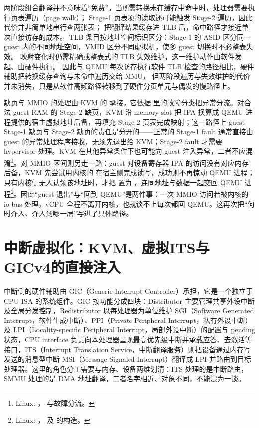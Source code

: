 两阶段组合翻译并不意味着“免费”。当所需转换未在缓存中命中时，处理器需要执行页表遍历（page walk）；
Stage-1 页表项的读取还可能触发 Stage-2 遍历，因此代价并非简单地串行查两张表；
把翻译结果缓存进 TLB 后，命中路径才接近单次直接访存的成本。
TLB 条目按地址空间标识区分：Stage-1 的 ASID 区分同一 guest 内的不同地址空间，VMID 区分不同虚拟机，使多 guest 切换时不必整表失效。
映射变化时仍需精确或整表式的 TLB 失效维护，这一维护动作由软件发起、由硬件执行。
因此与 QEMU 每次访存执行软件 TLB 检查的路径相比，硬件辅助把转换缓存查询与未命中遍历交给 MMU，
但两阶段遍历与失效维护的代价并未消失，只是从软件高频路径转移到了硬件分页单元与偶发的慢路径上\cite{source4,source5}。

缺页与 MMIO 的处理由 KVM 的  承接，它依据  里的故障分类把异常分流。对合法 guest RAM 的 Stage-2 缺页，KVM 沿 memory slot 把 IPA 换算成 QEMU 进程提供的宿主虚拟地址后备，再填充 Stage-2 页表完成映射；这一路径上 guest Stage-1 缺页与 Stage-2 缺页的责任是分开的——正常的 Stage-1 fault 通常直接由 guest 的异常处理程序接收，无须先退出给 KVM；Stage-2 fault 才需要 hypervisor 处理。KVM 在其他异常条件下也可能向 guest 注入异常，二者不应混淆\footnote{Linux: ， 与故障分流。}。对 MMIO 区间则另走一路：guest 对设备寄存器 IPA 的访问没有对应内存后备，KVM 先尝试用内核的  在宿主侧完成读写，成功则不再惊动 QEMU 进程；只有内核侧无人认领该地址时，才把  置为 ，连同地址与数据一起交回 QEMU 进程\footnote{Linux: ， 及  的构造。}。因此“guest 退出”与“回到 QEMU”是两件事：一次 MMIO 访问若被内核的 io bus 处理，vCPU 全程不离开内核，也就谈不上每次都回 QEMU。这再次把“何时介入、介入到哪一层”写进了具体路径。

\section{中断虚拟化：KVM、虚拟ITS与GICv4的直接注入}\label{sec:hardware-irq}

中断侧的硬件辅助由 GIC（Generic Interrupt Controller）承担，它是一个独立于 CPU ISA 的系统组件。GIC 按功能分成四块：Distributor 主要管理共享外设中断及全局分发控制，Redistributor 以每处理器为单位维护 SGI（Software Generated Interrupt，软件生成中断）、PPI（Private Peripheral Interrupt，私有外设中断）及 LPI（Locality-specific Peripheral Interrupt，局部外设中断）的配置与 pending 状态，CPU interface 负责向本处理器呈现最高优先级中断并承载应答、去激活等接口，ITS（Interrupt Translation Service，中断翻译服务）则把设备通过内存写发送的消息型中断 MSI（Message Signaled Interrupt）翻译成 LPI 并路由到目标处理器\cite{source9}。这里的角色分工需要与内存、设备两维划清：ITS 处理的是中断路由，SMMU 处理的是 DMA 地址翻译，二者名字相近、对象不同，不能混为一谈。

